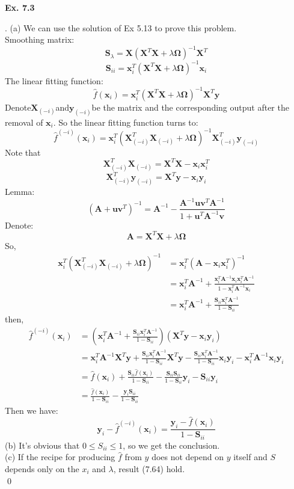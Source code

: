 \documentclass[12pt]{article}
\newenvironment{sol}
  {\par\vspace{3mm}\noindent{\it Solution}.}
  {\qed}
\begin{document}
\begin{flushleft}
\textbf{Ex. 7.3}
\end{flushleft}
\def \X {\mathbf{X}}
\def \S {\mathbf{S}}
\def \x {\mathbf{x}}
\def \y {\mathbf{y}}
\def \A {\mathbf{A}}
\begin{sol}
(a) We can use the solution of Ex 5.13 to prove this problem.\\
Smoothing matrix:
$$\S_{\lambda}=\X(\X^T\X+\lambda\mathbf{\Omega})^{-1}\X^T$$
$$\S_{ii}=\x_i^T(\X^T\X+\lambda\mathbf{\Omega})^{-1}\x_i$$
The linear fitting function:
$$\hat{f}(\x_i)=\x_i^T(\X^T\X+\lambda\mathbf{\Omega})^{-1}\X^T\y$$
Denote$\X_{(-i)}$and$\y_{(-i)}$be the matrix and the corresponding output after the removal of $\x_i$. So the linear fitting function turns to:
$$\hat{f}^{(-i)}(\x_i)=\x_i^T(\X_{(-i)}^T\X_{(-i)}+\lambda\mathbf{\Omega})^{-1}\X_{(-i)}^T\y_{(-i)}$$
Note that 
$$\X_{(-i)}^T\X_{(-i)}=\X^T\X-\x_i\x_i^T$$
$$\X_{(-i)}^T\y_{(-i)}=\X^T\y-\x_i\y_i$$
Lemma:
$$(\A+\mathbf{uv}^T)^{-1}=\A^{-1}-\frac{\A^{-1}\mathbf{uv}^T\A^{-1}}{1+\mathbf{u}^T\A^{-1}\mathbf{v}}$$
Denote: 
$$\A=\X^T\X+\lambda\mathbf{\Omega}$$
So,
\begin{equation*}
\begin{split}
\x_i^T(\X_{(-i)}^T\X_{(-i)}+\lambda\mathbf{\Omega})^{-1}&=\x_i^T(\A-\x_i\x_i^T)^{-1}\\
&=\x_i^T\A^{-1}+\frac{\x_i^T\A^{-1}\x_i\x_i^{T}\A^{-1}}{1-\x_i^T\A^{-1}\x_i}\\
&=\x_i^T\A^{-1}+\frac{\S_{ii}\x_i^T\A^{-1}}{1-\S_{ii}}
\end{split}
\end{equation*}
then,
\begin{equation*}
\begin{split}
\hat{f}^{(-i)}(\x_i)&=(\x_i^T\A^{-1}+\frac{\S_{ii}\x_i^T\A^{-1}}{1-\S_{ii}})(\X^T\y-\x_i\y_i)\\
&=\x_i^T\A^{-1}\X^T\y+\frac{\S_{ii}\x_i^T\A^{-1}}{1-\S_{ii}}\X^T\y-\frac{\S_{ii}\x_i^T\A^{-1}}{1-\S_{ii}}\x_i\y_i-\x_i^T\A^{-1}\x_i\y_i\\
&=\hat{f}(\x_i)+\frac{\S_{ii}\hat{f}(\x_i)}{1-\S_{ii}}-\frac{\S_{ii}\S_{ii}}{1-\S_{ii}}\y_i-\S_{ii}\y_{i}\\
&=\frac{\hat{f}(\x_i)}{1-\S_{ii}}-\frac{\y_i\S_{ii}}{1-\S_{ii}}
\end{split}
\end{equation*}
Then we have:
$$\y_i-\hat{f}^{(-i)}(\x_i)=\frac{\y_i-\hat{f}(\x_i)}{1-\S_{ii}}$$
(b) It's obvious that $0 \leq S_{ii} \leq 1$, so we get the conclusion.\\
(c) If the recipe for producing $\hat{f}$ from $y$ does not depend on $y$ itself and $S$ depends only on the $x_i$ and $\lambda$, result (7.64) hold.\\
\end{sol}
\end{document}
